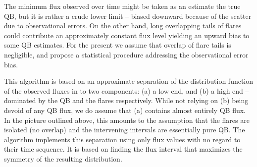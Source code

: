 \documentclass[twocolumn,linenumbers]{aastex62}
\begin{document}
The minimum flux observed over time 
might be taken as an estimate the true QB,
but it is rather a crude lower limit  -- biased downward 
because of the scatter due to observational errors.
On the other hand, long overlapping tails of flares 
could contribute an approximately constant flux level
yielding an upward bias to some QB estimates.
For the present we assume that overlap of flare tails
is negligible, and propose a statistical
procedure addressing the observational error bias.

This algorithm is based on an approximate 
separation of the distribution function of the observed
fluxes in to two components: 
(a) a low end, and (b) a high end -- dominated by
the QB and the flares respectively.
While not relying on (b) being devoid of any QB flux,
we do assume that (a) contains almost entirely QB flux.
In the picture outlined above, this amounts to the
assumption that the flares are isolated (no overlap) 
and the intervening intervals are essentially pure QB.
The algorithm implements this separation
using only flux values with no regard to 
their time sequence.  It is based on finding the
flux interval that maximizes the symmetry of 
the resulting distribution.
\end{document}
